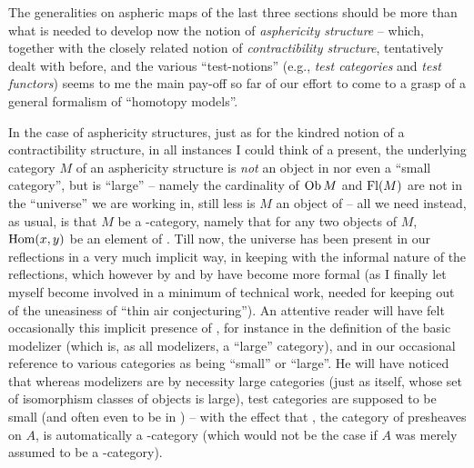 \bigbreak
\noindent\hfill{}\par

%
\label{sec:75}%
The generalities on aspheric maps of the last three sections should be
more than what is needed to develop now the notion of
\emph{asphericity structure} -- which, together with the closely
related notion of \emph{contractibility structure}, tentatively dealt
with before, and the various ``test-notions'' (e.g., \emph{test
  categories} and \emph{test functors}) seems to me the main pay-off
so far of our effort to come to a grasp of a general formalism of
``homotopy models''.

In the case of asphericity structures, just as for the kindred notion
of a contractibility structure, in all instances I could think of a
present, the underlying category $M$ of an asphericity structure is
\emph{not} an object in \Cat{} nor even a ``small category'', but is
``large'' -- namely the cardinality of $\operatorname{Ob} M$ and $\operatorname{Fl}(M)$ are not in
the ``universe'' we are working in, still less is $M$ an object of
\scrU{} -- all we need instead, as usual, is that $M$ be a
\scrU-category, namely that for any two objects of $M$, $\operatorname{Hom}(x,y)$ be
an element of \scrU. Till now, the universe \scrU{} has been present
in our reflections in a very much implicit way, in keeping with the
informal nature of the reflections, which however by and by have
become more formal (as I finally let myself become involved
in a minimum of technical work, needed for keeping out of
the uneasiness of ``thin air conjecturing''). An attentive reader will
have felt occasionally this implicit presence of \scrU, for instance
in the definition of the basic modelizer \Cat{} (which is, as all
modelizers, a ``large'' category), and in our occasional reference to
various categories as being ``small'' or ``large''. He will have noticed that whereas modelizers are by necessity
large categories (just as \Hot{} itself, whose set of isomorphism
classes of objects is large), test categories are supposed to be small
(and often even to be in \Cat) -- with the effect that \Ahat, the
category of presheaves on $A$, is automatically a \scrU-category
(which would not be the case if $A$ was merely assumed to be a
\scrU-category).

